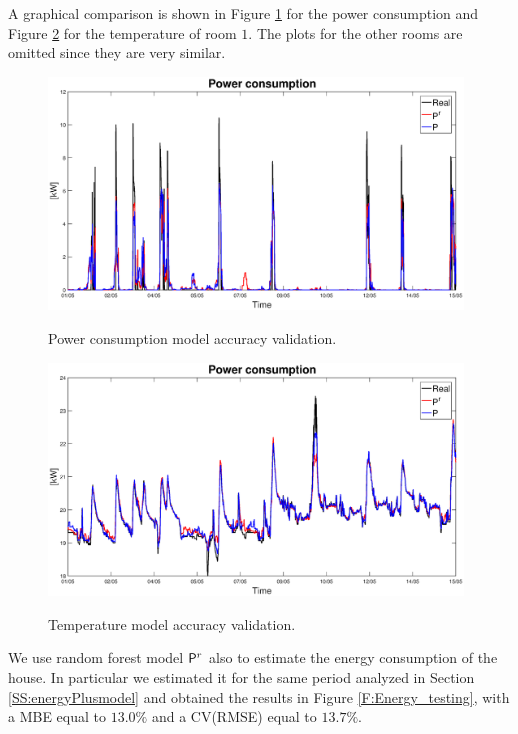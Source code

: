 A graphical comparison is shown in Figure \ref{F:power_testing} for the power consumption and Figure \ref{F:temperature_testing} for the temperature of room $1$. The plots for the other rooms are omitted since they are very similar.

\begin{figure}[h!]
\begin{center}
	\includegraphics[width=26pc]{figures/power_testing.eps}
	\caption{Power consumption model accuracy validation.}
	\captionsetup{justification=centering}
	\label{F:power_testing}
\end{center}
\end{figure}

\begin{figure}[h!]
\begin{center}
	\includegraphics[width=26pc]{figures/temperature_testing.eps}
	\caption{Temperature model accuracy validation.}
	\captionsetup{justification=centering}
	\label{F:temperature_testing}
\end{center}
\end{figure}

We use random forest model $\mathsf{P}^r$ also to estimate the energy consumption of the house. In particular we estimated it for the same period analyzed in Section \ref{SS:energyPlusmodel} and obtained the results in Figure \ref{F:Energy_testing}, with a MBE equal to $13.0\%$ and a CV(RMSE) equal to $13.7\%$.

